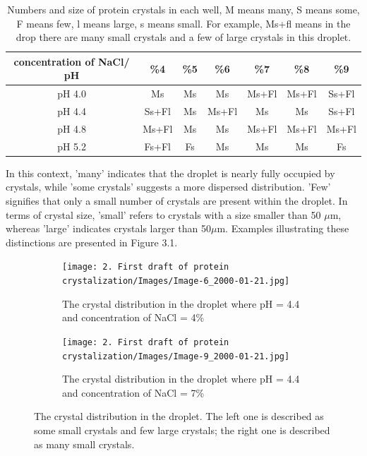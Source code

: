 \documentclass[a4paper,english,12pt,bibliography=totoc]{scrreprt}
\begin{document}
\begin{table}[h]
\centering
\begin{tabular}{|c|c|c|c|c|c|c|}
  \hline
   concentration of NaCl/ pH& \%4 & \%5 & \%6 & \%7 &\%8 & \%9 \\
    \hline
	pH 4.0 &Ms &Ms & Ms& Ms+Fl &Ms+Fl &Ss+Fl \\
  \hline
  	pH 4.4 &Ss+Fl &Ms &Ms+Fl &Ms &Ms &Ss+Fl \\
  \hline
        pH 4.8 &Ms+Fl &Ms &Ms & Ms+Fl&Ms+Fl & Ms+Fl\\
  \hline
        pH 5.2 &Fs+Fl &Fs & Ms &Ms &Ms &Fs \\
  \hline
\end{tabular}
\caption{Numbers and size of protein crystals in each well, M means many, S means some, F means few, l means large, s means small. For example, Ms+fl means in the drop there are many small crystals and a few of large crystals in this droplet.}
\end{table}


In this context, 'many' indicates that the droplet is nearly fully occupied by crystals, while 'some crystals' suggests a more dispersed distribution. 'Few' signifies that only a small number of crystals are present within the droplet. In terms of crystal size, 'small' refers to crystals with a size smaller than 50 $\mu$m, whereas 'large' indicates crystals larger than 50$\mu$m. Examples illustrating these distinctions are presented in Figure 3.1.


\begin{figure}[H]

    \begin{subfigure}{0.45\textwidth}
        \centering
        \texttt{[image: 2. First draft of protein crystalization/Images/Image-6\_2000-01-21.jpg]}
        \caption{The crystal distribution in the droplet where pH = 4.4 and concentration of NaCl = 4\%}
        \label{fig:pH4.4,4ptg}
    \end{subfigure}
    \begin{subfigure}{0.45\textwidth}
        \centering
        \texttt{[image: 2. First draft of protein crystalization/Images/Image-9\_2000-01-21.jpg]}
        \caption{The crystal distribution in the droplet where pH = 4.4 and concentration of NaCl = 7\%}
        \label{fig:pH4.4,7ptg}
    \end{subfigure}
    \caption{The crystal distribution in the droplet. The left one is described as some small crystals and few large crystals; the right one is described as many small crystals. }
    \label{fig:ym_cp_curve}
    
\end{figure}
\end{document}
